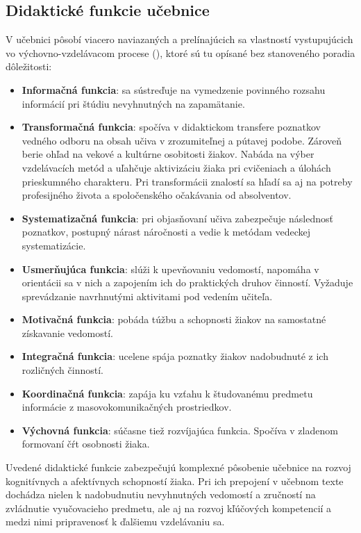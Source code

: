 \subsection{Didaktické funkcie učebnice}
V učebnici pôsobí viacero naviazaných a prelínajúcich sa vlastností vystupujúcich vo výchovno-vzdelávacom procese (\cite{zujev_ako_1986}), ktoré sú tu opísané bez stanoveného poradia dôležitosti:
\begin{itemize}
\itemsep0pt
\item \textbf{Informačná funkcia}: sa sústreďuje na vymedzenie povinného rozsahu informácií pri štúdiu nevyhnutných na zapamätanie.
\item \textbf{Transformačná funkcia}: spočíva v didaktickom transfere poznatkov vedného odboru na obsah učiva v zrozumiteľnej a pútavej podobe. Zároveň berie ohľad na vekové a kultúrne osobitosti žiakov. Nabáda na výber vzdelávacích metód a uľahčuje aktivizáciu žiaka pri cvičeniach a úlohách prieskumného charakteru. Pri transformácii znalostí sa hľadí sa aj na potreby profesijného života a spoločenského očakávania od absolventov.
\item \textbf{Systematizačná funkcia}: pri objasňovaní učiva zabezpečuje následnosť poznatkov, postupný nárast náročnosti a vedie k metódam vedeckej systematizácie.
\item \textbf{Usmerňujúca funkcia}: slúži k upevňovaniu vedomostí, napomáha v orientácii sa v nich a zapojením ich do praktických druhov činností. Vyžaduje sprevádzanie navrhnutými aktivitami pod vedením učiteľa.
\item \textbf{Motivačná funkcia}: pobáda túžbu a schopnosti žiakov na samostatné získavanie vedomostí.
\item \textbf{Integračná funkcia}: ucelene spája poznatky žiakov nadobudnuté z ich rozličných činností.
\item \textbf{Koordinačná funkcia}: zapája ku vzťahu k študovanému predmetu informácie z masovokomunikačných prostriedkov.
\item \textbf{Výchovná funkcia}: súčasne tiež rozvíjajúca funkcia. Spočíva v zladenom formovaní čŕt osobnosti žiaka.
\end{itemize}
Uvedené didaktické funkcie zabezpečujú komplexné pôsobenie učebnice na rozvoj kognitívnych a afektívnych schopností žiaka. Pri ich prepojení v učebnom texte dochádza nielen k nadobudnutiu nevyhnutných vedomostí a zručností na zvládnutie vyučovacieho predmetu, ale aj na rozvoj kľúčových kompetencií a medzi nimi pripravenosť k ďalšiemu vzdelávaniu sa.


